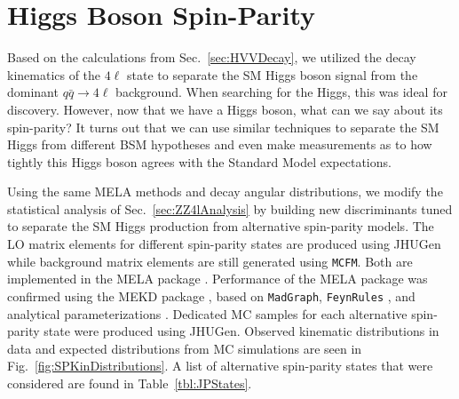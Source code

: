 \section{Higgs Boson Spin-Parity}
\label{sec:SpinParity}

Based on the calculations from Sec.~\ref{sec:HVVDecay}, we utilized the decay kinematics of the $4\ell$ state to separate the SM Higgs boson signal from the dominant $q\bar{q}\rightarrow 4\ell$ background. When searching for the Higgs, this was ideal for discovery. However, now that we have a Higgs boson, what can we say about its spin-parity? It turns out that we can use similar techniques to separate the SM Higgs from different BSM hypotheses and even make measurements as to how tightly this Higgs boson agrees with the Standard Model expectations.

Using the same MELA methods and decay angular distributions, we modify the statistical analysis of Sec.~\ref{sec:ZZ4lAnalysis} by building new discriminants tuned to separate the SM Higgs production from alternative spin-parity models. The LO matrix elements for different spin-parity states are produced using JHUGen while background matrix elements are still generated using {\tt MCFM}. Both are implemented in the MELA package \cite{Chatrchyan:2012ufa,Gao:2010qx,Bolognesi:2012mm,Anderson:2013afp}. Performance of the MELA package was confirmed using the MEKD package \cite{Avery:2012um}, based on {\tt MadGraph}, {\tt FeynRules} \cite{Christensen:2008py}, and analytical parameterizations \cite{Chen:2012jy,Chen:2014pia,Chen:2014gka}. Dedicated MC samples for each alternative spin-parity state were produced using JHUGen. Observed kinematic distributions in data and expected distributions from MC simulations are seen in Fig.~\ref{fig:SPKinDistributions}. A list of alternative spin-parity states that were considered are found in Table~\ref{tbl:JPStates}.

